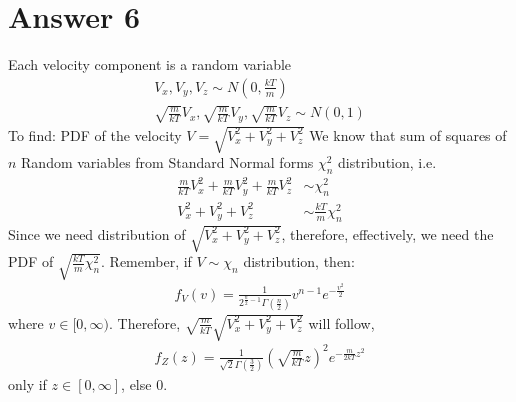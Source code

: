 \documentclass[a4paper]{article}
\begin{document}
\section{Answer 6}
Each velocity component is a random variable 
\begin{equation*}
	\begin{split}
		V_x, V_y, V_z \sim N\left( 0,\frac{kT}{m} \right)\\
		\sqrt{ \frac{m }{kT}} V_x, \sqrt{ \frac{m }{kT}} V_y, \sqrt{  \frac{m }{kT}} V_z \sim N\left( 0,1 \right) 
	\end{split}
\end{equation*}
To find: PDF of the velocity $V = \sqrt{V_x^2 + V_y^2 + V_z^2} $ 
\newline\newline
We know that sum of squares of $n$ Random variables from Standard Normal forms $\chi_n^2$ distribution, i.e.
\begin{equation*}
	\begin{split}
		\frac{m}{kT}V_x^2 + \frac{m}{kT}V_y^2 + \frac{m}{kT}V_z^2 &\sim \chi_n^2\\
		V_x^2 + V_y^2 +V_z^2 &\sim \frac{kT}{m}\chi_n^2 
	\end{split}
\end{equation*}
Since we need distribution of $\sqrt{V_x^2 + V_y^2 + V_z^2}$, therefore, effectively, we need the PDF of $\sqrt{\frac{kT}{m} \chi_n^2} $.
\newline\newline
Remember, if $V \sim \chi_n$ distribution, then:
\begin{equation*}
	\begin{split}
		f_V\left( v \right) = \frac{1}{2^{\frac{n}{2}-1}\Gamma\left( \frac{n}{2} \right) } v^{n-1}e^{-\frac{v^2}{2}}	
	\end{split}
\end{equation*}
where $v \in [0,\infty)$.
\newline\newline
Therefore, $\sqrt{\frac{m}{kT}}\sqrt{V_x^2 + V_y^2 + V_z^2}  $ will follow,
\begin{equation*}
	\begin{split}
		f_Z\left( z \right) = \frac{1}{\sqrt{2}\Gamma\left( \frac{3}{2} \right)  } \left( \sqrt{\frac{m}{kT}} z  \right) ^{2} e^{-\frac{m}{2kT}z^2} 
	\end{split}
\end{equation*}
only if $z \in [0,\infty]$, else 0.
\newpage
\end{document}
